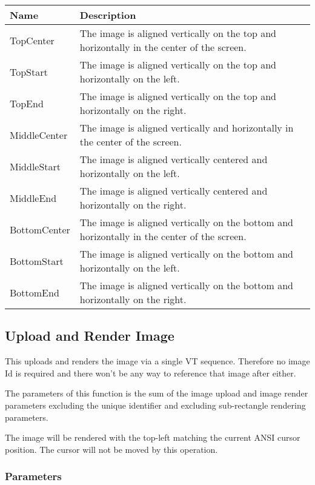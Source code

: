 \documentclass[a4paper]{article}
\begin{document}
\begin{tabular}{ |l|l| }
    \hline
    \textbf{Name}          & \textbf{Description} \\
    \hline
    TopCenter     & The image is aligned vertically on the top and horizontally in the center of the screen. \\
    TopStart      & The image is aligned vertically on the top and horizontally on the left. \\
    TopEnd        & The image is aligned vertically on the top and horizontally on the right. \\
    \hline
    MiddleCenter  & The image is aligned vertically and horizontally in the center of the screen. \\
    MiddleStart   & The image is aligned vertically centered and horizontally on the left. \\
    MiddleEnd     & The image is aligned vertically centered and horizontally on the right. \\
    \hline
    BottomCenter  & The image is aligned vertically on the bottom and horizontally in the center of
    the screen. \\
    BottomStart   & The image is aligned vertically on the bottom and horizontally on the left. \\
    BottomEnd     & The image is aligned vertically on the bottom and horizontally on the right. \\
    \hline
\end{tabular}

\subsection{Upload and Render Image}

This uploads and renders the image via a single VT sequence. Therefore no image Id
is required and there won't be any way to reference that image after either.

The parameters of this function is the sum of the image upload and image render parameters excluding the unique
identifier and excluding sub-rectangle rendering parameters.

The image will be rendered with the top-left matching the current ANSI cursor position.
The cursor will not be moved by this operation.

\subsubsection*{Parameters}
\end{document}
